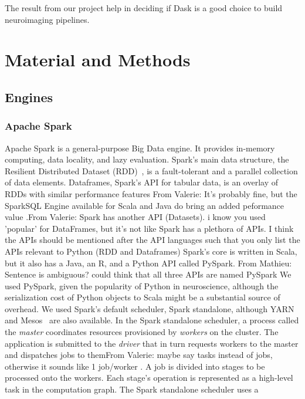 \documentclass[conference]{IEEEtran}
\newcommand{\MD}[1]{\color{magenta}From Mathieu: #1 \color{black}}
\newcommand{\VHS}[1]{\color{green}From Valerie: #1 \color{black}}
\begin{document}
The result from our project help in deciding if Dask is a good choice to build
neuroimaging pipelines.


\section{Material and Methods}

\subsection{Engines}

\subsubsection{Apache Spark} Apache Spark is a general-purpose Big Data engine. It
provides in-memory computing, data locality, and lazy evaluation. Spark's main data
structure, the Resilient Distributed Dataset (RDD)~\cite{RDD}, is a fault-tolerant
and a parallel collection of data elements. Dataframes, Spark's API for tabular data, is
an overlay of RDDs with similar performance features \VHS{It's probably fine, but the SparkSQL Engine available for Scala and Java do bring an added peformance value}.\VHS{Spark has another API (Datasets). i know you used 'popular' for DataFrames, but it's not like Spark has a plethora of APIs. I think the APIs should be mentioned after the API languages such that you only list the APIs relevant to Python (RDD and Dataframes)} Spark's core is written in
Scala, but it also has a Java, an R, and a Python API called PySpark. \MD{Sentence is
ambiguous? could think that all three APIs are named PySpark} We used PySpark, given
the popularity of Python in neuroscience, although the serialization cost of Python
objects to Scala might be a substantial source of overhead. We used Spark's default
scheduler, Spark standalone, although YARN~\cite{vavilapalli2013apache} and
Mesos~\cite{hindman2011mesos} are also available. In the Spark standalone scheduler,
a process called the \emph{master} coordinates resources provisioned by
\emph{workers} on the cluster. The application is submitted to the \emph{driver} that
in turn requests workers to the master and dispatches jobs to them\VHS{maybe say tasks instead of jobs, otherwise it sounds like 1 job/worker}. A job is divided
into stages to be processed onto the workers. Each stage's operation is represented
as a high-level task in the computation graph. The Spark standalone scheduler uses a
\end{document}

